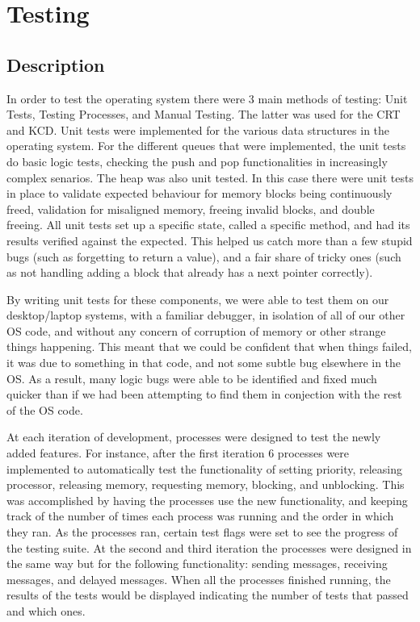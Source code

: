 \documentclass[12pt]{report}
\begin{document}
\chapter{Testing}

\section{Description}

In order to test the operating system there were 3 main methods of testing: Unit Tests, Testing Processes, and Manual Testing. The latter was used for the CRT and KCD. Unit tests were implemented for the various data structures in the operating system. For the different queues that were implemented, the unit tests do basic logic tests, checking the push and pop functionalities in increasingly complex senarios. The heap was also unit tested. In this case there were unit tests in place to validate expected behaviour for memory blocks being continuously freed, validation for misaligned memory, freeing invalid blocks, and double freeing. All unit tests set up a specific state, called a specific method, and had its results verified against the expected. This helped us catch more than a few stupid bugs (such as forgetting to return a value), and a fair share of tricky ones (such as not handling adding a block that already has a next pointer correctly).

By writing unit tests for these components, we were able to test them on our desktop/laptop systems, with a familiar debugger, in isolation of all of our other OS code, and without any concern of corruption of memory or other strange things happening. This meant that we could be confident that when things failed, it was due to something in that code, and not some subtle bug elsewhere in the OS. As a result, many logic bugs were able to be identified and fixed much quicker than if we had been attempting to find them in conjection with the rest of the OS code.

At each iteration of development, processes were designed to test the newly added features. For instance, after the first iteration 6 processes were implemented to automatically test the functionality of setting priority, releasing processor, releasing memory, requesting memory, blocking, and unblocking. This was accomplished by having the processes use the new functionality, and keeping track of the number of times each process was running and the order in which they ran. As the processes ran, certain test flags were set to see the progress of the testing suite. At the second and third iteration the processes were designed in the same way but for the following functionality: sending messages, receiving messages, and delayed messages.  When all the processes finished running, the results of the tests would be displayed indicating the number of tests that passed and which ones.
\end{document}
